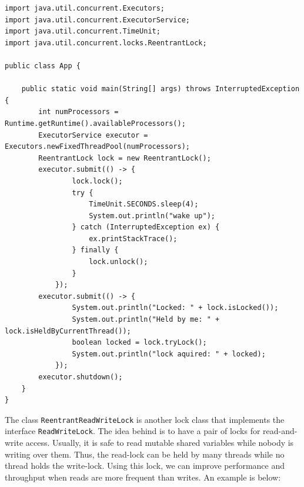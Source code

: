 \documentclass[openany, a4paper]{book}
\theoremstyle{break}
\theoremstyle{example}
\theoremstyle{note}
\theoremstyle{break}
\theoremstyle{exercise}
\begin{document}
\begin{verbatim}
import java.util.concurrent.Executors;
import java.util.concurrent.ExecutorService;
import java.util.concurrent.TimeUnit;
import java.util.concurrent.locks.ReentrantLock;

public class App {

    public static void main(String[] args) throws InterruptedException {
        int numProcessors = Runtime.getRuntime().availableProcessors();
        ExecutorService executor = Executors.newFixedThreadPool(numProcessors);
        ReentrantLock lock = new ReentrantLock();
        executor.submit(() -> {
                lock.lock();
                try {
                    TimeUnit.SECONDS.sleep(4);
                    System.out.println("wake up");
                } catch (InterruptedException ex) {
                    ex.printStackTrace();
                } finally {
                    lock.unlock();
                }
            });
        executor.submit(() -> {
                System.out.println("Locked: " + lock.isLocked());
                System.out.println("Held by me: " + lock.isHeldByCurrentThread());
                boolean locked = lock.tryLock();
                System.out.println("lock aquired: " + locked);
            });
        executor.shutdown();
    }
}
\end{verbatim}

The class \texttt{ReentrantReadWriteLock} is another lock class that implements the
interface \texttt{ReadWriteLock}.  The idea behind is to have a pair of locks for
read-and-write access. Usually, it is safe to read mutable shared variables
while nobody is writing over them. Thus, the read-lock can be held by many
threads while no thread holds the write-lock. Using this lock, we can
improve performance and throughput when reads are more frequent than
writes. An example is below:
\end{document}
